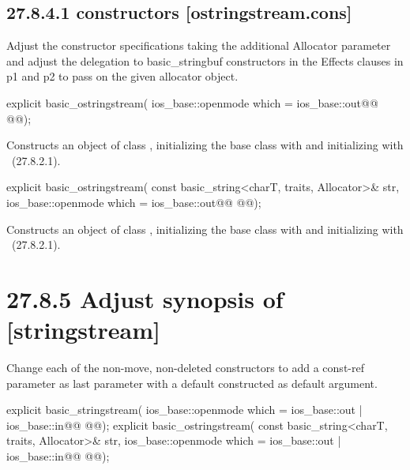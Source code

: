 \documentclass[ebook,11pt,article]{memoir}
\begin{document}
\subsection{27.8.4.1  constructors [ostringstream.cons]}
Adjust the constructor specifications taking the additional Allocator parameter and adjust the delegation to basic_stringbuf constructors in the Effects clauses in p1 and p2 to pass on the given allocator object.

\begin{itemdecl}
explicit basic_ostringstream(
  ios_base::openmode which = ios_base::out@\ins{,}@
  @@);
\end{itemdecl}

\begin{itemdescr}
\pnum
\effects
Constructs an object of class
,
initializing the base class with
and initializing  with
~({27.8.2.1}).
\end{itemdescr}

\begin{itemdecl}
explicit basic_ostringstream(
  const basic_string<charT, traits, Allocator>& str,
  ios_base::openmode which = ios_base::out@\ins{,}@
  @@);
\end{itemdecl}

\begin{itemdescr}
\pnum
\effects
Constructs an object of class
,
initializing the base class with
and initializing  with
~({27.8.2.1}).
\end{itemdescr}


\section{27.8.5 Adjust synopsis of  [stringstream]}
Change each of the non-move, non-deleted constructors to add a const-ref  parameter as last parameter with a default constructed  as default argument. 
\begin{codeblock}
explicit basic_stringstream(
             ios_base::openmode which = ios_base::out | ios_base::in@\ins{,}@
             @@);
explicit basic_ostringstream(
             const basic_string<charT, traits, Allocator>& str,
             ios_base::openmode which = ios_base::out | ios_base::in@\ins{,}@
             @@);
\end{codeblock}
\end{document}
